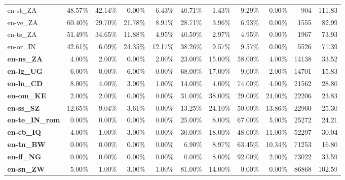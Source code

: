 \begin{table*}[hbt!]
{\begin{tabular}{l|rrrr|rrrr|rr}
            en-st\_ZA               & 48.57\% & 42.14\% & 0.00\%  & 6.43\%  & 40.71\% & 1.43\%  & 9.29\%  & 0.00\%  & 904         & 111.83            \\
            en-ve\_ZA               & 60.40\% & 29.70\% & 21.78\% & 8.91\%  & 28.71\% & 3.96\%  & 6.93\%  & 0.00\%  & 1555        & 82.99             \\
            en-ts\_ZA               & 51.49\% & 34.65\% & 11.88\% & 4.95\%  & 40.59\% & 2.97\%  & 4.95\%  & 0.00\%  & 1967        & 73.93             \\
            en-or\_IN               & 42.61\% & 6.09\%  & 24.35\% & 12.17\% & 38.26\% & 9.57\%  & 9.57\%  & 0.00\%  & 5526        & 71.39             \\
            \textbf{en-ns\_ZA }     & 4.00\%  & 2.00\%  & 0.00\%  & 2.00\%  & 23.00\% & 15.00\% & 58.00\% & 4.00\%  & 14138       & 33.52             \\
            \textbf{en-lg\_UG}      & 6.00\%  & 0.00\%  & 6.00\%  & 0.00\%  & 68.00\% & 17.00\% & 9.00\%  & 2.00\%  & 14701       & 15.83             \\
            \textbf{en-ln\_CD}      & 8.00\%  & 4.00\%  & 3.00\%  & 1.00\%  & 14.00\% & 4.00\%  & 74.00\% & 4.00\%  & 21562       & 28.80             \\
            \textbf{en-om\_KE}      & 2.00\%  & 2.00\%  & 0.00\%  & 0.00\%  & 31.00\% & 38.00\% & 29.00\% & 24.00\% & 22206       & 23.83             \\
            \textbf{en-ss\_SZ}      & 12.65\% & 9.04\%  & 3.61\%  & 0.00\%  & 13.25\% & 24.10\% & 50.00\% & 13.86\% & 22960       & 25.30             \\
            \textbf{en-te\_IN\_rom} & 0.00\%  & 0.00\%  & 0.00\%  & 0.00\%  & 25.00\% & 8.00\%  & 67.00\% & 5.00\%  & 25272       & 24.21             \\
            \textbf{en-cb\_IQ}      & 4.00\%  & 1.00\%  & 3.00\%  & 0.00\%  & 30.00\% & 18.00\% & 48.00\% & 11.00\% & 52297       & 30.04             \\
            \textbf{en-tn\_BW}      & 0.00\%  & 0.00\%  & 0.00\%  & 0.00\%  & 6.90\%  & 8.97\%  & 63.45\% & 10.34\% & 71253       & 16.80             \\
            \textbf{en-ff\_NG}      & 0.00\%  & 0.00\%  & 0.00\%  & 0.00\%  & 0.00\%  & 8.00\%  & 92.00\% & 2.00\%  & 73022       & 33.59             \\
            \textbf{en-sn\_ZW}      & 5.00\%  & 1.00\%  & 3.00\%  & 1.00\%  & 81.00\% & 14.00\% & 0.00\%  & 0.00\%  & 86868       & 102.59            \\

\end{tabular}}
\end{table*}
